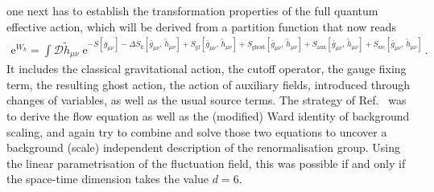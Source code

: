 \documentclass[11pt]{book}
\numberwithin{equation}{chapter}
\begin{document}
one next has to establish the transformation properties of the full quantum
effective action, which will be derived from a partition function that now reads
\begin{align}
  \mathrm e^{W_k} = \int \mathcal{D}\tilde h_{\mu\nu} \;
  \mathrm e^{
    - S[g_{\mu\nu}]
    - \Delta S_k[\bar g_{\mu\nu},\, \tilde h_{\mu\nu}]
    + S_{\mathrm{gf}}[\bar g_{\mu\nu},\, \tilde h_{\mu\nu}]
    + S_{\mathrm{ghost}}[\bar g_{\mu\nu},\, \tilde h_{\mu\nu}]
    + S_{\mathrm{aux}}[\bar g_{\mu\nu},\, \tilde h_{\mu\nu}]
    + S_{\mathrm{src}}[\bar g_{\mu\nu},\, \tilde h_{\mu\nu}]
  } \,.
\end{align}
It includes the classical gravitational action, the cutoff operator, the gauge fixing
term, the resulting ghost action, the action of auxiliary fields, introduced through
changes of variables, as well as the usual source terms. The strategy of
Ref.~\cite{Morris:2016spn} was to derive the flow equation as well as the (modified)
Ward identity of background scaling, and again try to combine and solve those two equations
to uncover a background (scale) independent description of the renormalisation group.
Using the linear parametrisation of the fluctuation field,
this was possible if and only if the space-time dimension takes the value $d=6$.
\end{document}
